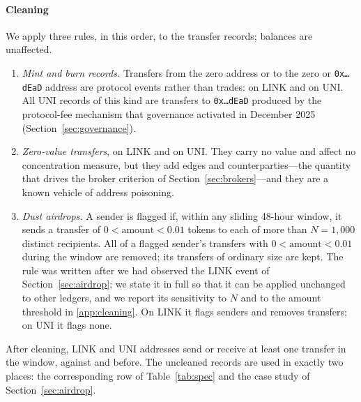 \paragraph{Cleaning}
We apply three rules, in this order, to the transfer records; balances are
unaffected.
\begin{enumerate}
  \item \emph{Mint and burn records.} Transfers from the zero address or to
  the zero or \texttt{0x\ldots dEaD} address are protocol events rather than
  trades:  on LINK and  on UNI. All UNI
  records of this kind are transfers to \texttt{0x\ldots dEaD} produced by the
  protocol-fee mechanism that governance activated in December 2025
  (Section~\ref{sec:governance}).
  \item \emph{Zero-value transfers},  on LINK and  on
  UNI. They carry no value and affect no concentration measure, but they add
  edges and counterparties---the quantity that drives the broker criterion of
  Section~\ref{sec:brokers}---and they are a known vehicle of address
  poisoning.
  \item \emph{Dust airdrops.} A sender is flagged if, within any sliding
  48-hour window, it sends a transfer of $0 < \text{amount} < 0.01$ tokens to
  each of more than $N = 1{,}000$ distinct recipients. All of a flagged
  sender's transfers with $0 < \text{amount} < 0.01$ during the window are
  removed; its transfers of ordinary size are kept. The rule was written
  after we had observed the LINK event of Section~\ref{sec:airdrop}; we state
  it in full so that it can be applied unchanged to other ledgers, and we
  report its sensitivity to $N$ and to the amount threshold in
  \ref{app:cleaning}. On LINK it flags  senders and
  removes  transfers; on UNI it flags none.
\end{enumerate}
After cleaning,  LINK and  UNI addresses send or
receive at least one transfer in the window, against  and
 before. The uncleaned records are used in exactly two
places: the corresponding row of Table~\ref{tab:spec} and the case study of
Section~\ref{sec:airdrop}.

